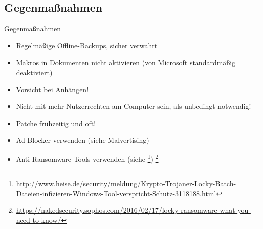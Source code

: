 \documentclass[10pt]{beamer}
\begin{document}
\subsection{Gegenmaßnahmen}
\begin{frame}{Gegenmaßnahmen}
	\begin{itemize}
		\item Regelmäßige Offline-Backups, sicher verwahrt
		\item Makros in Dokumenten nicht aktivieren (von Microsoft standardmäßig deaktiviert)
		\item Vorsicht bei Anhängen!
		\item Nicht mit mehr Nutzerrechten am Computer sein, als unbedingt notwendig!
		\item Patche frühzeitig und oft!
		\item Ad-Blocker verwenden (siehe Malvertising)
		\item Anti-Ransomware-Tools verwenden (siehe \footnote{http://www.heise.de/security/meldung/Krypto-Trojaner-Locky-Batch-Dateien-infizieren-Windows-Tool-verspricht-Schutz-3118188.html})
		\let\thefootnote\relax\footnote{\url{https://nakedsecurity.sophos.com/2016/02/17/locky-ransomware-what-you-need-to-know/}}
 	\end{itemize}

\end{frame}


{\1
\begin{frame}
\end{frame}}
\end{document}
